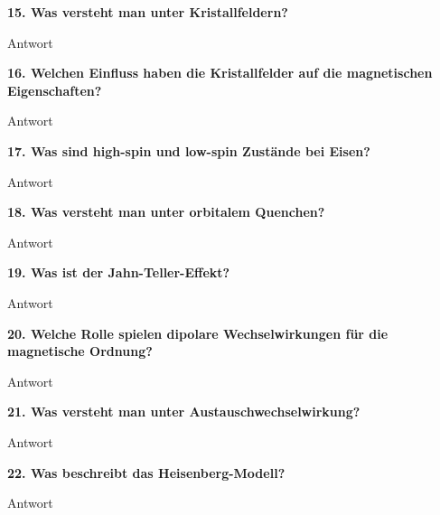 \noindent\textbf{15. Was versteht man unter Kristallfeldern?}\\
\begin{addmargin}[25pt]{0pt}
Antwort\\
\end{addmargin}

\noindent\textbf{16. Welchen Einfluss haben die Kristallfelder auf die magnetischen Eigenschaften?}\\
\begin{addmargin}[25pt]{0pt}
Antwort\\
\end{addmargin}

\noindent\textbf{17. Was sind high-spin und low-spin Zustände bei Eisen?}\\
\begin{addmargin}[25pt]{0pt}
Antwort\\
\end{addmargin}

\noindent\textbf{18. Was versteht man unter \glqq orbitalem Quenchen\grqq ?}\\
\begin{addmargin}[25pt]{0pt}
Antwort\\
\end{addmargin}

\noindent\textbf{19. Was ist der Jahn-Teller-Effekt?}\\
\begin{addmargin}[25pt]{0pt}
Antwort\\
\end{addmargin}

\noindent\textbf{20. Welche Rolle spielen dipolare Wechselwirkungen für die magnetische Ordnung?}\\
\begin{addmargin}[25pt]{0pt}
Antwort\\
\end{addmargin}

\noindent\textbf{21. Was versteht man unter Austauschwechselwirkung?}\\
\begin{addmargin}[25pt]{0pt}
Antwort\\
\end{addmargin}

\noindent\textbf{22. Was beschreibt das Heisenberg-Modell?}\\
\begin{addmargin}[25pt]{0pt}
Antwort\\
\end{addmargin}

